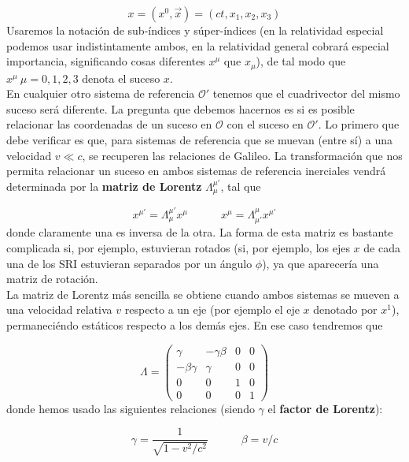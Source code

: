 \documentclass[12pt,a4paper]{book}
\numberwithin{equation}{section}
\numberwithin{figure}{section}
\newcommand{\tquad}{\quad \quad \quad}
\begin{document}
\begin{equation}
x = (x^0, \vec{x}) = (ct,x_1,x_2,x_3)
\end{equation}
Usaremos la notación de sub-índices y súper-índices (en la relatividad especial podemos usar indistintamente ambos, en la relatividad general cobrará especial importancia, significando cosas diferentes $x^\mu$ que $x_\mu$), de tal modo que $x^\mu \ \mu=0,1,2,3$ denota el suceso $x$. \\

En cualquier otro sistema de referencia $\mathcal{O}'$ tenemos que el cuadrivector del mismo suceso será diferente. La pregunta que debemos hacernos es si es posible relacionar las coordenadas de un suceso en $\mathcal{O}$ con el suceso en $\mathcal{O}'$. Lo primero que debe verificar es que, para sistemas de referencia que se muevan (entre sí) a una velocidad $v\ll c$, se recuperen las relaciones de Galileo. La transformación que nos permita relacionar un suceso en ambos sistemas de referencia inerciales vendrá determinada por la \textbf{matriz de Lorentz} $\Lambda_\mu^{\mu'}$, tal que 

\begin{equation}
x^{\mu'} = \Lambda_\mu^{\mu'} x^{\mu}  \tquad 
x^{\mu} = \Lambda_{\mu'}^{\mu} x^{\mu'} 
\end{equation}
donde claramente una es inversa de la otra. La forma de esta matriz es bastante complicada si, por ejemplo, estuvieran rotados (si, por ejemplo, los ejes $x$ de cada una de los SRI estuvieran separados por un ángulo $\phi$), ya que aparecería una matriz de rotación. \\

La matriz de Lorentz más sencilla se obtiene cuando ambos sistemas se mueven a una velocidad relativa $v$ respecto a un eje (por ejemplo el eje $x$ denotado por $x^1$), permaneciéndo estáticos respecto a los demás ejes. En ese caso tendremos que

\begin{equation}
\Lambda = \begin{pmatrix}
\gamma & - \gamma \beta & 0 & 0 \\
 - \beta \gamma &  \gamma  & 0 & 0 \\
0 & 0  & 1 & 0 \\
0 & 0  & 0 & 1
\end{pmatrix}
\end{equation}
donde hemos usado las siguientes relaciones (siendo $\gamma$ el \textbf{factor de Lorentz}):

\begin{equation}
\gamma = \frac{1}{\sqrt{1-v^2/c^2}} \tquad \beta = v/c
\end{equation}
\end{document}
